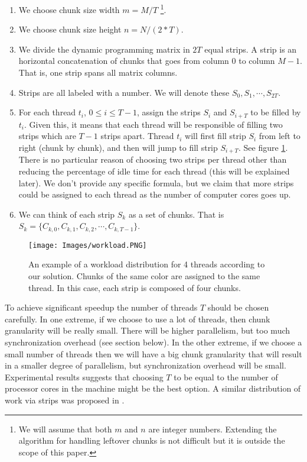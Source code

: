 \documentclass[journal]{IEEEtran}
\begin{document}
\begin{enumerate}
    \item We choose chunk size width $m = M / T$ \footnote{We will assume that both $m$ and $n$ are integer numbers. Extending the algorithm for handling leftover chunks is not difficult but it is outside the scope of this paper.}.
    \item We choose chunk size height $n = N / (2 * T)$.
    \item We divide the dynamic programming matrix in $2T$ equal strips. A strip is an horizontal concatenation of chunks that goes from column $0$ to column $M - 1$. That is, one strip spans all matrix columns.
    \item Strips are all labeled with a number. We will denote these $S_0, S_1, \cdots, S_{2T}$.
    \item For each thread $t_i$, $0 \leq i \leq T-1$, assign the strips $S_i$ and $S_{i + T}$ to be filled by $t_i$. Given this, it means that each thread will be responsible of filling two strips which are $T-1$ strips apart. Thread $t_i$ will first fill strip $S_i$ from left to right (chunk by chunk), and then will jump to fill strip $S_{i + T}$. See figure \ref{exec}. There is no particular reason of choosing two strips per thread other than reducing the percentage of idle time for each thread (this will be explained later). We don't provide any specific formula, but we claim that more strips could be assigned to each thread as the number of computer cores goes up.
    \item We can think of each strip $S_k$ as a set of chunks. That is $S_k = \{ C_{k, 0}, C_{k, 1}, C_{k,2}, \cdots, C_{k,T-1}\}$. 
\end{enumerate}

\begin{figure}[h]
  \begin{center}
    \texttt{[image: Images/workload.PNG]}
  \end{center}
  \caption{An example of a workload distribution for 4 threads according to our solution. Chunks of the same color are assigned to the same thread. In this case, each strip is composed of four chunks.}
  \label{exec}
\end{figure}

To achieve significant speedup the number of threads $T$ should be chosen carefully. In one extreme, if we choose to use a lot of threads, then chunk granularity will be really small. There will be higher parallelism, but too much synchronization overhead (see section below). In the other extreme, if we choose a small number of threads then we will have a big chunk granularity that will result in a smaller degree of parallelism, but synchronization overhead will be small. Experimental results suggests that choosing $T$ to be equal to the number of processor cores in the machine might be the best option. A similar distribution of work via strips was proposed in \cite{martins2001multithreaded}.
\end{document}
